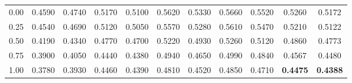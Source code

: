 \documentclass[sigconf,anonymous,review]{acmart}
\begin{document}
\begin{table}[t]
\begin{minipage}[t]{0.485\textwidth}
{\begin{tabular}{c|*{4}{cc}|cc}
\midrule
0.00 & 0.4590 & 0.4740 & 0.5170 & 0.5100 & 0.5620 & 0.5330 & 0.5660 & 0.5520 & 0.5260      & 0.5172      \\
0.25 & 0.4540 & 0.4690 & 0.5120 & 0.5050 & 0.5570 & 0.5280 & 0.5610 & 0.5470 & 0.5210      & 0.5122      \\
0.50 & 0.4190 & 0.4340 & 0.4770 & 0.4700 & 0.5220 & 0.4930 & 0.5260 & 0.5120 & 0.4860      & 0.4773      \\
0.75 & 0.3900 & 0.4050 & 0.4440 & 0.4380 & 0.4940 & 0.4650 & 0.4990 & 0.4840 & 0.4567      & 0.4480      \\
1.00 & 0.3780 & 0.3930 & 0.4460 & 0.4390 & 0.4810 & 0.4520 & 0.4850 & 0.4710 & \textbf{0.4475} & \textbf{0.4388} \\
\bottomrule
\end{tabular}}
\end{minipage}


\end{table}
\end{document}
